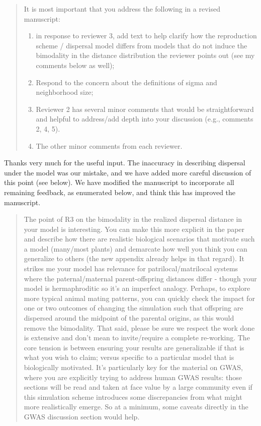 \begin{quote}
    It is most important that you address the following in a revised manuscript:
    \begin{enumerate}
        \item in response to reviewer 3, add text to help clarify how the reproduction scheme / dispersal model differs from models that do not induce the bimodality in the distance distribution the reviewer points out (see my comments below as well); 
        \item Respond to the concern about the definitions of sigma and neighborhood size; 
        \item Reviewer 2 has several minor comments that would be straightforward and helpful to address/add depth into your discussion (e.g., comments 2, 4, 5). 
        \item The other minor comments from each reviewer. 
    \end{enumerate}
\end{quote}

Thanks very much for the useful input.
The inaccuracy in describing dispersal under the model was our mistake,
and we have added more careful discussion of this point (see below).
We have modified the manuscript to incorporate all remaining feedback,
as enumerated below,
and think this has improved the manuscript.


\begin{quote}
The point of R3 on the bimodality in the realized dispersal distance in your model is interesting. You can make this more explicit in the paper and describe how there are realistic biological scenarios that motivate such a model (many/most plants) and demarcate how well you think you can generalize to others (the new appendix already helps in that regard). It strikes me your model has relevance for patrilocal/matrilocal systems where the paternal/maternal parent-offspring distances differ - though your model is hermaphroditic so it's an imperfect analogy. Perhaps, to explore more typical animal mating patterns, you can quickly check the impact for one or two outcomes of changing the simulation such that offspring are dispersed around the midpoint of the parental origins, as this would remove the bimodality. That said, please be sure we respect the work done is extensive and don't mean to invite/require a complete re-working. The core tension is between ensuring your results are generalizable if that is what you wish to claim; versus specific to a particular model that is biologically motivated. It's particularly key for the material on GWAS, where you are explicitly trying to address human GWAS results: those sections will be read and taken at face value by a large community even if this simulation scheme introduces some discrepancies from what might more realistically emerge. So at a minimum, some caveats directly in the GWAS discussion section would help.
\end{quote}


